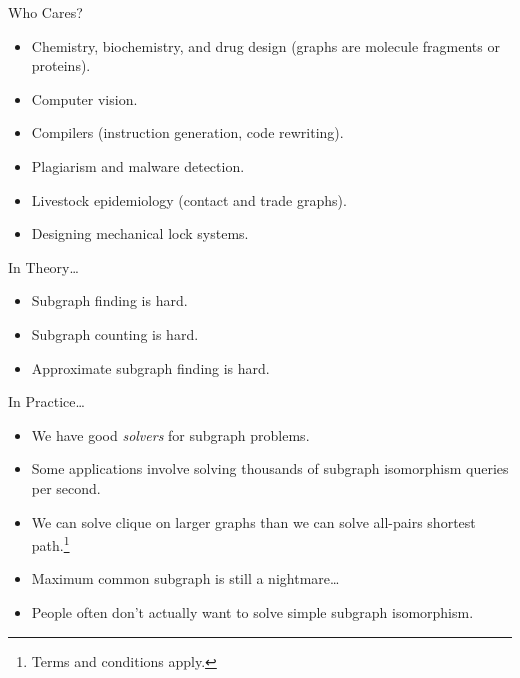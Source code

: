 \documentclass[aspectratio=169,compress,10pt]{beamer}
\begin{document}
\begin{frame}{Who Cares?}
    \begin{itemize}
        \item Chemistry, biochemistry, and drug design (graphs are molecule fragments or proteins).
        \item Computer vision.
        \item Compilers (instruction generation, code rewriting).
        \item Plagiarism and malware detection.
        \item Livestock epidemiology (contact and trade graphs).
        \item Designing mechanical lock systems.
    \end{itemize}
\end{frame}

\begin{frame}{In Theory\ldots}
    \begin{itemize}
        \item Subgraph finding is hard.
        \item Subgraph counting is hard.
        \item Approximate subgraph finding is hard.
    \end{itemize}
\end{frame}

\begin{frame}{In Practice\ldots}
    \begin{itemize}
        \item We have good \emph{solvers} for subgraph problems.
        \item Some applications involve solving thousands of subgraph isomorphism queries per second.
        \item We can solve clique on larger graphs than we can solve all-pairs
            shortest path.\footnote{Terms and conditions apply.}
        \item<2-> Maximum common subgraph is still a nightmare\ldots
        \item<3-> People often don't actually want to solve simple subgraph isomorphism.
    \end{itemize}
\end{frame}
\end{document}

